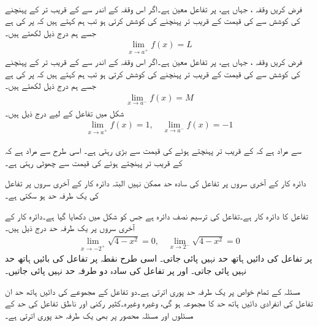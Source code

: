 \\
فرض کریں  وقفہ ، جہاں  ہے، پر تفاعل  معین ہے۔اگر  اس وقفہ کے اندر سے   کے قریب تر   کے   پہنچنے کی کوشش  سے  کی قیمت   کے قریب تر  پہنچنے کی کوشش کرتی ہو تب ہم کہتے ہیں کہ  پر  کی    ہے جسے  ہم درج ذیل لکھتے ہیں۔
\begin{align*}
\lim\limits_{x\to a^+} f(x)=L
\end{align*}
فرض کریں  وقفہ ، جہاں  ہے، پر تفاعل  معین ہے۔اگر  اس وقفہ کے اندر سے   کے قریب تر   کے  پہنچنے کی کوشش  سے  کی قیمت   کے قریب تر پہنچنے کی کوشش کرتی ہو تب ہم کہتے ہیں کہ  پر  کی    ہے جسے ہم درج ذیل لکھتے ہیں۔
\begin{align*}
\lim\limits_{x\to a^-} f(x)=M
\end{align*}
شکل  میں تفاعل  کے لیے درج ذیل ہیں۔
\begin{align*}
\lim\limits_{x\to a^+} f(x)=1,\quad \lim\limits_{x\to a^-} f(x)=-1
\end{align*}

 سے مراد ہے کہ    کے قریب تر  پہنچتے ہوئے  کی قیمت  سے بڑی رہتی ہے۔ اسی طرح  سے مراد ہے کہ    کے قریب تر  پہنچتے ہوئے  کی قیمت  سے چھوٹی رہتی ہے۔ 

دائرہ کار کے آخری سروں پر تفاعل کی سادہ حد ممکن نہیں البتہ دائرہ کار کے آخری سروں پر تفاعل کی یک طرفہ حد  ہو سکتی ہے۔

تفاعل  کا دائرہ کار  ہے۔تفاعل کی ترسیم نصف دائرہ ہے جس کو شکل  میں دکھایا گیا ہے۔دائرہ کار کے آخری سروں پر یک طرفہ حد درج ذیل ہیں۔
\begin{align*}
\lim\limits_{x\to -2^+} \sqrt{4-x^2}=0,\quad  \lim\limits_{x\to 2^-} \sqrt{4-x^2}=0
\end{align*}
 پر تفاعل  کی دائیں ہاتھ حد نہیں پائی جاتی۔ اسی طرح  نقطہ  پر تفاعل کی بائیں ہاتھ حد نہیں پائی جاتی۔ اور  پر تفاعل کی  سادہ دو طرفہ حد نہیں پائی جاتیں۔

مسئلہ  کے تمام خواص پر یک طرفہ حد پوری اترتی ہے۔دو تفاعل کے مجموعے کی  دائیں ہاتھ حد  ان تفاعل  کی  انفرادی دائیں ہاتھ حد کا مجموعہ ہو گی، وغیرہ وغیرہ۔کثیر رکنی اور ناطق تفاعل کی حد کے مسئلوں اور مسئلہ محصور  پر بھی یک طرفہ حد پوری  اترتی ہے۔  

